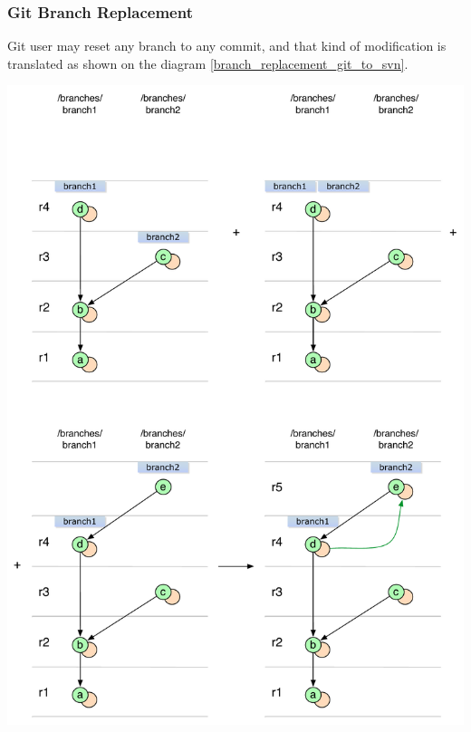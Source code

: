 \subsubsection{Git Branch Replacement}
Git user may reset any branch to any commit, and that kind of modification is translated as shown on the diagram \ref{branch_replacement_git_to_svn}.
\begin{center}
\includegraphics[width=\textwidth]{img/diagrams/branch_replacement_git_to_svn.pdf}%
\label{branch_replacement_git_to_svn}%
\end{center}

